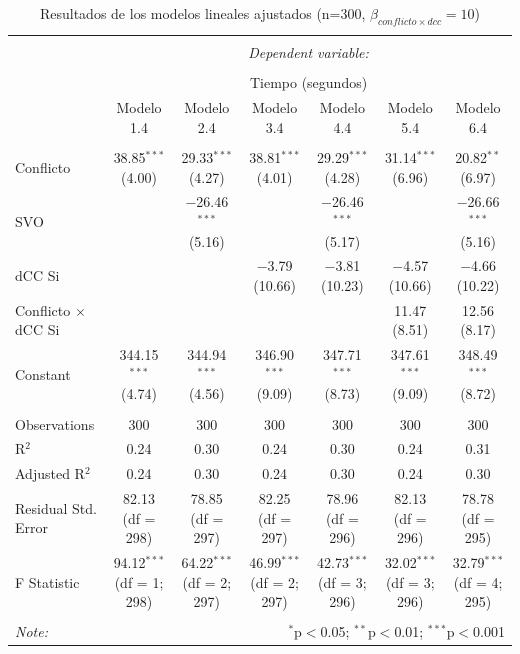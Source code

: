 \documentclass[
  spanish,
  10pt,
]{article}
\begin{document}
\begin{table}[H] \centering 
  \caption{Resultados de los modelos lineales ajustados (n=300, $\beta_{conflicto \times dcc} = 10$)} 
  \label{} 
\tiny 
\begin{tabular}{@{\extracolsep{5pt}}lcccccc} 
\\[-1.8ex]\hline 
\hline \\[-1.8ex] 
 & \multicolumn{6}{c}{\textit{Dependent variable:}} \\ 
\cline{2-7} 
\\[-1.8ex] & \multicolumn{6}{c}{Tiempo (segundos)} \\ 
 & Modelo 1.4 & Modelo 2.4 & Modelo 3.4 & Modelo 4.4 & Modelo 5.4 & Modelo 6.4 \\ 
\hline \\[-1.8ex] 
 Conflicto & 38.85$^{***}$ (4.00) & 29.33$^{***}$ (4.27) & 38.81$^{***}$ (4.01) & 29.29$^{***}$ (4.28) & 31.14$^{***}$ (6.96) & 20.82$^{**}$ (6.97) \\ 
  SVO &  & $-$26.46$^{***}$ (5.16) &  & $-$26.46$^{***}$ (5.17) &  & $-$26.66$^{***}$ (5.16) \\ 
  dCC Si &  &  & $-$3.79 (10.66) & $-$3.81 (10.23) & $-$4.57 (10.66) & $-$4.66 (10.22) \\ 
  Conflicto $\times$ dCC Si &  &  &  &  & 11.47 (8.51) & 12.56 (8.17) \\ 
  Constant & 344.15$^{***}$ (4.74) & 344.94$^{***}$ (4.56) & 346.90$^{***}$ (9.09) & 347.71$^{***}$ (8.73) & 347.61$^{***}$ (9.09) & 348.49$^{***}$ (8.72) \\ 
 \hline \\[-1.8ex] 
Observations & 300 & 300 & 300 & 300 & 300 & 300 \\ 
R$^{2}$ & 0.24 & 0.30 & 0.24 & 0.30 & 0.24 & 0.31 \\ 
Adjusted R$^{2}$ & 0.24 & 0.30 & 0.24 & 0.30 & 0.24 & 0.30 \\ 
Residual Std. Error & 82.13 (df = 298) & 78.85 (df = 297) & 82.25 (df = 297) & 78.96 (df = 296) & 82.13 (df = 296) & 78.78 (df = 295) \\ 
F Statistic & 94.12$^{***}$ (df = 1; 298) & 64.22$^{***}$ (df = 2; 297) & 46.99$^{***}$ (df = 2; 297) & 42.73$^{***}$ (df = 3; 296) & 32.02$^{***}$ (df = 3; 296) & 32.79$^{***}$ (df = 4; 295) \\ 
\hline 
\hline \\[-1.8ex] 
\textit{Note:}  & \multicolumn{6}{r}{$^{*}$p$<$0.05; $^{**}$p$<$0.01; $^{***}$p$<$0.001} \\ 
\end{tabular} 
\end{table}
\end{document}
